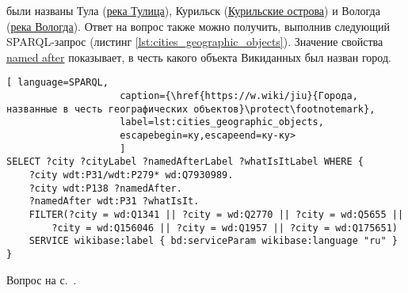 \begin{task}
    \label{answer:cities_geographic_objects}
     были названы Тула (\href{https://w.wiki/oLJ}{река Тулица}), Курильск (\href{https://w.wiki/oLH}{Курильские острова}) и Вологда (\href{https://w.wiki/oLG}{река Вологда}). Ответ на вопрос также можно получить, выполнив следующий SPARQL-запрос (листинг \ref{lst:cities_geographic_objects}). Значение свойства \href{https://www.wikidata.org/wiki/Property:P138}{named after} показывает, в честь какого объекта Викиданных был назван город.
    
    
    \begin{lstlisting}[ language=SPARQL, 
                    caption={\href{https://w.wiki/jiu}{Города, названные в честь географических объектов}\protect\footnotemark},
                    label=lst:cities_geographic_objects, 
                    escapebegin=ку,escapeend=ку-ку>
                    ]
SELECT ?city ?cityLabel ?namedAfterLabel ?whatIsItLabel WHERE {
	?city wdt:P31/wdt:P279* wd:Q7930989.
	?city wdt:P138 ?namedAfter.
	?namedAfter wdt:P31 ?whatIsIt.
	FILTER(?city = wd:Q1341 || ?city = wd:Q2770 || ?city = wd:Q5655 ||
		?city = wd:Q156046 || ?city = wd:Q1957 || ?city = wd:Q175651)
	SERVICE wikibase:label { bd:serviceParam wikibase:language "ru" }
}
    \end{lstlisting}
    \small{Вопрос на с.~\pageref{lst:population_town}.}
\end{task}

